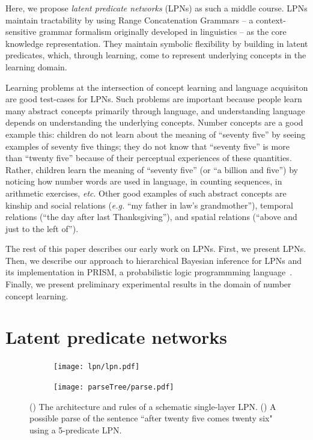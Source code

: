 \documentclass{article} %
\begin{document}
Here, we propose \emph{latent predicate networks} (LPNs) as such a
middle course. LPNs maintain tractability by using Range Concatenation
Grammars -- a context-sensitive grammar formalism originally developed
in linguistics -- as the core knowledge representation. They
maintain symbolic flexibility by building in latent predicates, which,
through learning, come to represent underlying concepts in the
learning domain.

Learning problems at the intersection of concept learning and language
acquisiton are good test-cases for LPNs. Such problems are important
because people learn many abstract concepts primarily through
language, and understanding language depends on understanding the
underlying concepts. Number concepts are a good example this: children
do not learn about the meaning of ``seventy five'' by seeing examples
of seventy five things; they do not know that ``seventy five'' is more
than ``twenty five'' because of their perceptual experiences of these
quantities. Rather, children learn the meaning of ``seventy five'' (or
``a billion and five'') by noticing how number words are used in
language, in counting sequences, in arithmetic exercises, {\it
  etc}. Other good examples of such abstract concepts are kinship and
social relations ({\it e.g.}  ``my father in law's grandmother''),
temporal relations (``the day after last Thanksgiving''), and spatial
relations (``above and just to the left of'').

The rest of this paper describes our early work on LPNs. First, we
present LPNs. Then, we describe our approach to hierarchical Bayesian
inference for LPNs and its implementation in PRISM, a probabilistic
logic programmming
language~\cite{DBLP:journals/jair/SatoK01}. Finally, we present
preliminary experimental results in the domain of number concept
learning.

\section{Latent predicate networks}

\begin{figure}[t]
  \begin{subfigure}[b]{0.5\linewidth}
    \texttt{[image: lpn/lpn.pdf]}
    \caption{}
    \label{fig:architecture}
  \end{subfigure}
  \hfill
  \begin{subfigure}[b]{0.5\linewidth}
    \texttt{[image: parseTree/parse.pdf]}
    \caption{}
    \label{fig:parseexample}
  \end{subfigure}
  \caption{() The architecture and rules of a schematic single-layer LPN. () A possible parse of the sentence ``after twenty five comes twenty six" using a 5-predicate LPN.}

\end{figure}
\end{document}
